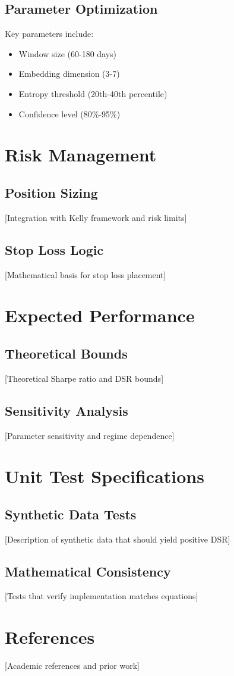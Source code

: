\documentclass{article}
\begin{document}
\subsection{Parameter Optimization}

Key parameters include:
\begin{itemize}
\item Window size (60-180 days)
\item Embedding dimension (3-7)
\item Entropy threshold (20th-40th percentile)
\item Confidence level (80\%-95\%)
\end{itemize}

\section{Risk Management}

\subsection{Position Sizing}

[Integration with Kelly framework and risk limits]

\subsection{Stop Loss Logic}

[Mathematical basis for stop loss placement]

\section{Expected Performance}

\subsection{Theoretical Bounds}

[Theoretical Sharpe ratio and DSR bounds]

\subsection{Sensitivity Analysis}

[Parameter sensitivity and regime dependence]

\section{Unit Test Specifications}

\subsection{Synthetic Data Tests}

[Description of synthetic data that should yield positive DSR]

\subsection{Mathematical Consistency}

[Tests that verify implementation matches equations]

\section{References}

[Academic references and prior work]
\end{document}
